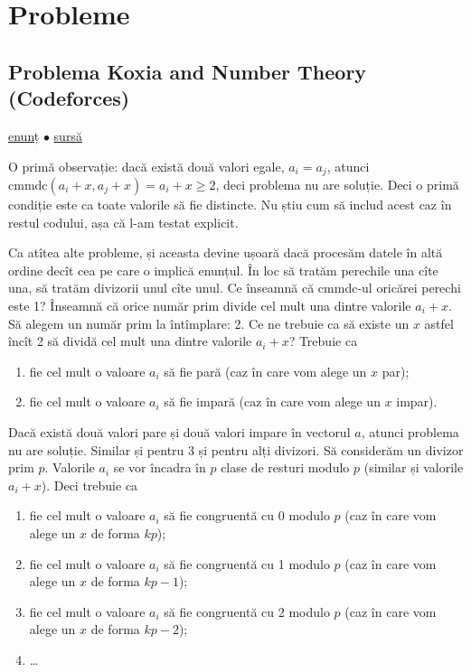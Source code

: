 \documentclass[../main.tex]{subfiles}
\begin{document}
\section{Probleme}

\subsection{Problema Koxia and Number Theory (Codeforces)}
\label{problem:koxia-and-number-theory}

\href{https://codeforces.com/contest/1770/problem/C}{enunț}
$\bullet$
\hyperref[code:koxia-and-number-theory]{sursă}

O primă observație: dacă există două valori egale, $a_i = a_j$, atunci $\text{cmmdc}(a_i + x, a_j + x) = a_i + x \geq 2$, deci problema nu are soluție. Deci o primă condiție este ca toate valorile să fie distincte. Nu știu cum să includ acest caz în restul codului, așa că l-am testat explicit.

Ca atîtea alte probleme, și aceasta devine ușoară dacă procesăm datele în altă ordine decît cea pe care o implică enunțul. În loc să tratăm perechile una cîte una, să tratăm divizorii unul cîte unul. Ce înseamnă că cmmdc-ul oricărei perechi este 1? Înseamnă că orice număr prim divide cel mult una dintre valorile $a_i + x$. Să alegem un număr prim la întîmplare: 2.  Ce ne trebuie ca să existe un $x$ astfel încît 2 să dividă cel mult una dintre valorile $a_i + x$? Trebuie ca

\begin{enumerate}
  \item fie cel mult o valoare $a_i$ să fie pară (caz în care vom alege un $x$ par);
  \item fie cel mult o valoare $a_i$ să fie impară (caz în care vom alege un $x$ impar).
\end{enumerate}

Dacă există două valori pare și două valori impare în vectorul $a$, atunci problema nu are soluție. Similar și pentru 3 și pentru alți divizori. Să considerăm un divizor prim $p$. Valorile $a_i$ se vor încadra în $p$ clase de resturi modulo $p$ (similar și valorile $a_i + x$). Deci trebuie ca

\begin{enumerate}
  \item fie cel mult o valoare $a_i$ să fie congruentă cu 0 modulo $p$ (caz în care vom alege un $x$ de forma $kp$);

  \item fie cel mult o valoare $a_i$ să fie congruentă cu 1 modulo $p$ (caz în care vom alege un $x$ de forma $kp - 1$);

  \item fie cel mult o valoare $a_i$ să fie congruentă cu 2 modulo $p$ (caz în care vom alege un $x$ de forma $kp - 2$);

  \item \dots
\end{enumerate}
\end{document}
